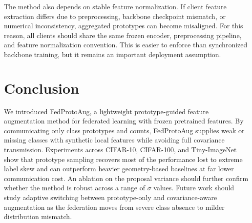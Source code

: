 ﻿\documentclass[conference]{IEEEtran}
\newcommand{\method}{FedProtoAug}
\begin{document}
The method also depends on stable feature normalization. If client feature extraction differs due to preprocessing, backbone checkpoint mismatch, or numerical inconsistency, aggregated prototypes can become misaligned. For this reason, all clients should share the same frozen encoder, preprocessing pipeline, and feature normalization convention. This is easier to enforce than synchronized backbone training, but it remains an important deployment assumption.

\section{Conclusion}
We introduced \method, a lightweight prototype-guided feature augmentation method for federated learning with frozen pretrained features. By communicating only class prototypes and counts, \method{} supplies weak or missing classes with synthetic local features while avoiding full covariance transmission. Experiments across CIFAR-10, CIFAR-100, and Tiny-ImageNet show that prototype sampling recovers most of the performance lost to extreme label skew and can outperform heavier geometry-based baselines at far lower communication cost. An ablation on the proposal variance should further confirm whether the method is robust across a range of $\sigma$ values. Future work should study adaptive switching between prototype-only and covariance-aware augmentation as the federation moves from severe class absence to milder distribution mismatch.



\end{document}
